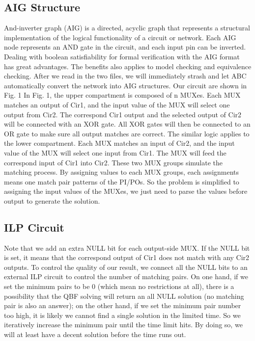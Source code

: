 \subsection{AIG Structure}
And-inverter graph (AIG) is a directed, acyclic graph that represents a structural implementation of the logical functionality of a circuit or network.
Each AIG node represents an AND gate in the circuit, and each input pin can be inverted. Dealing with boolean satisfiability for formal verification with the AIG format has great advantages. The benefits also applies to model checking and equivalence checking.
After we read in the two files, we will immediately strash and let ABC automatically convert the network into AIG structures. Our circuit are shown in Fig. 1
In Fig. 1, the upper compartment is composed of n MUXes. Each MUX matches an output of Cir1, and the input value of the MUX will select one output from Cir2. The correspond Cir1 output and the selected output of Cir2 will be connected with an XOR gate. All XOR gates will then be connected to an OR gate to make sure all output matches are correct.
The similar logic applies to the lower compartment. Each MUX matches an input of Cir2, and the input value of the MUX will select one input from Cir1. The MUX will feed the correspond input of Cir1 into Cir2.
These two MUX groups simulate the matching process. By assigning values to each MUX groups, each assignments means one match pair patterns of the PI/POs. So the problem is simplified to assigning the input values of the MUXes, we just need to parse the values before output to generate the solution.
\subsection{ILP Circuit}
 Note that we add an extra NULL bit for each output-side MUX. If the NULL bit is set, it means that the correspond output of Cir1 does not match with any Cir2 outputs.
To control the quality of our result, we connect all the NULL bits to an external ILP circuit to control the number of matching pairs. On one hand, if we set the minimum pairs to be 0 (which mean no restrictions at all), there is a possibility that the QBF solving will return an all NULL solution (no matching pair is also an answer); on the other hand, if we set the minimum pair number too high, it is likely we cannot find a single solution in the limited time. So we iteratively increase the minimum pair until the time limit hits. By doing so, we will at least have a decent solution before the time runs out.

